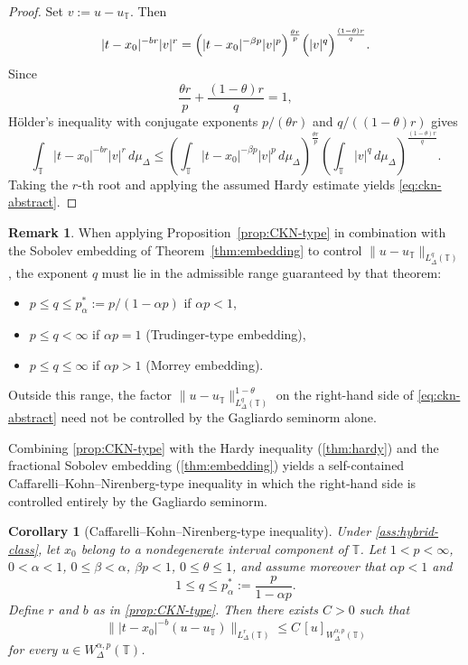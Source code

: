 \documentclass[11pt,a4paper]{article}
\numberwithin{equation}{section}
\newtheorem{corollary}[corollary]{Corollary}
\theoremstyle{definition}
\newtheorem{remark}[remark]{Remark}
\newcommand{\T}{\mathbb{T}}
\begin{document}
\begin{proof}
Set $v:=u-u_{\T}$. Then
\[
|t-x_0|^{-br}|v|^r
=
\Bigl(|t-x_0|^{-\beta p}|v|^p\Bigr)^{\frac{\theta r}{p}}
\Bigl(|v|^q\Bigr)^{\frac{(1-\theta)r}{q}}.
\]
Since
\[
\frac{\theta r}{p}+\frac{(1-\theta)r}{q}=1,
\]
H\"older's inequality with conjugate exponents $p/(\theta r)$ and
$q/((1-\theta)r)$ gives
\[
\int_{\T}|t-x_0|^{-br}|v|^r\,d\mu_\Delta
\le
\left(
\int_{\T}|t-x_0|^{-\beta p}|v|^p\,d\mu_\Delta
\right)^{\frac{\theta r}{p}}
\left(
\int_{\T}|v|^q\,d\mu_\Delta
\right)^{\frac{(1-\theta)r}{q}}.
\]
Taking the $r$-th root and applying the assumed Hardy estimate yields
\eqref{eq:ckn-abstract}.
\end{proof}
\begin{remark}\label{rem:ckn-admissible-q}
When applying Proposition~\ref{prop:CKN-type} in combination with
the Sobolev embedding of Theorem~\ref{thm:embedding} to control
$\|u-u_\T\|_{L^q_\Delta(\T)}$, the exponent $q$ must lie in the
admissible range guaranteed by that theorem:
\begin{itemize}
\item $p \le q \le p^*_\alpha := p/(1-\alpha p)$
      \quad if $\alpha p < 1$,
\item $p \le q < \infty$
      \quad if $\alpha p = 1$
      (Trudinger-type embedding),
\item $p \le q \le \infty$
      \quad if $\alpha p > 1$
      (Morrey embedding).
\end{itemize}
Outside this range, the factor $\|u-u_\T\|^{1-\theta}_{L^q_\Delta(\T)}$
on the right-hand side of \eqref{eq:ckn-abstract} need not be
controlled by the Gagliardo seminorm alone.
\end{remark}
Combining \cref{prop:CKN-type} with the Hardy inequality
(\cref{thm:hardy}) and the fractional Sobolev embedding
(\cref{thm:embedding}) yields a self-contained
Caffarelli--Kohn--Nirenberg-type inequality in which the right-hand side is
controlled entirely by the Gagliardo seminorm.

\begin{corollary}[Caffarelli--Kohn--Nirenberg-type inequality]
\label{cor:ckn}
Under \cref{ass:hybrid-class}, let $x_0$ belong to a nondegenerate interval
component of $\T$. Let $1<p<\infty$, $0<\alpha<1$, $0\le\beta<\alpha$,
$\beta p<1$, $0\le\theta\le 1$, and assume moreover that $\alpha p<1$ and
\[
1\le q\le p_\alpha^*:=\frac{p}{1-\alpha p}.
\]
Define $r$ and $b$ as in \cref{prop:CKN-type}. Then there exists $C>0$ such
that
\begin{equation}\label{eq:ckn}
\bigl\||t-x_0|^{-b}(u-u_{\T})\bigr\|_{L^r_\Delta(\T)}
\le
C\,[u]_{W^{\alpha,p}_\Delta(\T)}
\end{equation}
for every $u\in W^{\alpha,p}_\Delta(\T)$.
\end{corollary}
\end{document}
